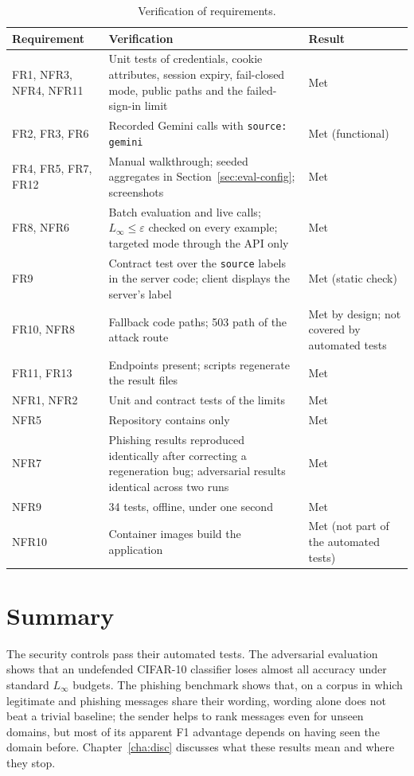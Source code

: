 \begin{table}[htbp]
\centering
\caption{Verification of requirements.}
\label{tab:verif}
\scriptsize
\begin{tabular}{P{2.0cm}P{7.0cm}P{2.8cm}}
\toprule
Requirement & Verification & Result \\
\midrule
FR1, NFR3, NFR4, NFR11 & Unit tests of credentials, cookie attributes, session expiry, fail-closed mode, public paths and the failed-sign-in limit & Met \\
FR2, FR3, FR6 & Recorded Gemini calls with \texttt{source: gemini} & Met (functional) \\
FR4, FR5, FR7, FR12 & Manual walkthrough; seeded aggregates in Section~\ref{sec:eval-config}; screenshots & Met \\
FR8, NFR6 & Batch evaluation and live calls; $L_\infty \le \varepsilon$ checked on every example; targeted mode through the API only & Met \\
FR9 & Contract test over the \texttt{source} labels in the server code; client displays the server's label & Met (static check) \\
FR10, NFR8 & Fallback code paths; 503 path of the attack route & Met by design; not covered by automated tests \\
FR11, FR13 & Endpoints present; scripts regenerate the result files & Met \\
NFR1, NFR2 & Unit and contract tests of the limits & Met \\
NFR5 & Repository contains only  & Met \\
NFR7 & Phishing results reproduced identically after correcting a regeneration bug; adversarial results identical across two runs & Met \\
NFR9 & 34 tests, offline, under one second & Met \\
NFR10 & Container images build the application & Met (not part of the automated tests) \\
\bottomrule
\end{tabular}
\end{table}

\section{Summary}

The security controls pass their automated tests. The adversarial evaluation shows that an undefended CIFAR-10 classifier loses almost all accuracy under standard $L_\infty$ budgets. The phishing benchmark shows that, on a corpus in which legitimate and phishing messages share their wording, wording alone does not beat a trivial baseline; the sender helps to rank messages even for unseen domains, but most of its apparent F1 advantage depends on having seen the domain before. Chapter~\ref{cha:disc} discusses what these results mean and where they stop.
